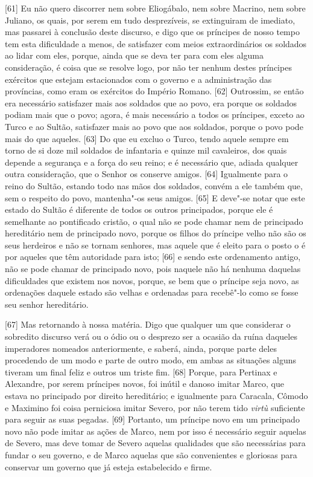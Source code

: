 {[}61{]} Eu não quero discorrer nem sobre Eliogábalo, nem sobre Macrino,
nem sobre Juliano, os quais, por serem em tudo desprezíveis, se
extinguiram de imediato, mas passarei à conclusão deste discurso, e digo
que os príncipes de nosso tempo tem esta dificuldade a menos, de
satisfazer com meios extraordinários os soldados ao lidar com eles,
porque, ainda que se deva ter para com eles alguma consideração, é coisa
que se resolve logo, por não ter nenhum destes príncipes exércitos que
estejam estacionados com o governo e a administração das províncias,
como eram os exércitos do Império Romano. {[}62{]} Outrossim, se então
era necessário satisfazer mais aos soldados que ao povo, era porque os
soldados podiam mais que o povo; agora, é mais necessário a todos os
príncipes, exceto ao Turco e ao Sultão, satisfazer mais ao povo que aos soldados, porque o
povo pode mais do que aqueles. {[}63{]} Do que eu excluo o Turco, tendo
aquele sempre em torno de si doze mil soldados de infantaria e quinze
mil cavaleiros, dos quais depende a segurança e a força do seu reino; e
é necessário que, adiada qualquer outra consideração, que o Senhor os
conserve amigos. {[}64{]} Igualmente para o reino do Sultão, estando
todo nas mãos dos soldados, convém a ele também que, sem o respeito do
povo, mantenha"-os seus amigos. {[}65{]} E deve"-se notar que este estado
do Sultão é diferente de todos os outros principados, porque ele é
semelhante ao pontificado cristão, o qual não se pode chamar nem de
principado hereditário nem de principado novo, porque os filhos do
príncipe velho não são os seus herdeiros e não se tornam senhores, mas
aquele que é eleito para o posto o é por aqueles que têm autoridade para
isto; {[}66{]} e sendo este ordenamento antigo, não se pode chamar de
principado novo, pois naquele não há nenhuma daquelas dificuldades que
existem nos novos, porque, se bem que o príncipe seja novo, as
ordenações daquele estado são velhas e ordenadas para recebê"-lo como se
fosse seu senhor hereditário.

{[}67{]} Mas retornando à nossa matéria. Digo que qualquer um que
considerar o sobredito discurso verá ou o ódio ou o desprezo ser a
ocasião da ruína daqueles imperadores nomeados anteriormente, e saberá,
ainda, porque parte deles procedendo de um modo e parte de outro modo,
em ambas as situações alguns tiveram um final feliz e outros um triste
fim. {[}68{]} Porque, para Pertinax e Alexandre, por serem príncipes
novos, foi inútil e danoso imitar Marco, que estava no principado por
direito hereditário; e igualmente para Caracala, Cômodo e Maximino foi
coisa perniciosa imitar Severo, por não terem tido \emph{virtù}
suficiente para seguir as suas pegadas. {[}69{]} Portanto, um príncipe
novo em um principado novo não pode imitar as ações de Marco, nem por
isso é necessário seguir aquelas de Severo, mas deve tomar de Severo
aquelas qualidades que são necessárias para fundar o seu governo, e de
Marco aquelas que são convenientes e gloriosas para conservar um governo
que já esteja estabelecido e firme.

